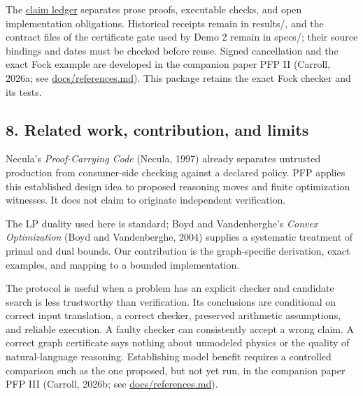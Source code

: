 \documentclass[
  11pt,
]{article}
\begin{document}
The
\href{https://github.com/dbccpage/the_symbol_game/blob/main/education/documentation/030_pfp_proposal_fidelity_protocol_pfp/papers/symbol_game/001_pfp_discrete_cochain_retraction_and_toy_involutions/paper_claim_ledger.md}{claim
ledger} separates prose proofs, executable checks, and open
implementation obligations. Historical receipts remain in results/, and
the contract files of the certificate gate used by Demo 2 remain in
specs/; their source bindings and dates must be checked before reuse.
Signed cancellation and the exact Fock example are developed in the
companion paper PFP II (Carroll, 2026a; see
\href{https://github.com/dbccpage/the_symbol_game/blob/main/education/documentation/030_pfp_proposal_fidelity_protocol_pfp/papers/symbol_game/001_pfp_discrete_cochain_retraction_and_toy_involutions/docs/references.md}{docs/references.md}).
This package retains the exact Fock checker and its tests.

\subsection{8. Related work, contribution, and
limits}\label{related-work-contribution-and-limits}

Necula's \emph{Proof-Carrying Code} (Necula, 1997) already separates
untrusted production from consumer-side checking against a declared
policy. PFP applies this established design idea to proposed reasoning
moves and finite optimization witnesses. It does not claim to originate
independent verification.

The LP duality used here is standard; Boyd and Vandenberghe's
\emph{Convex Optimization} (Boyd and Vandenberghe, 2004) supplies a
systematic treatment of primal and dual bounds. Our contribution is the
graph-specific derivation, exact examples, and mapping to a bounded
implementation.

The protocol is useful when a problem has an explicit checker and
candidate search is less trustworthy than verification. Its conclusions
are conditional on correct input translation, a correct checker,
preserved arithmetic assumptions, and reliable execution. A faulty
checker can consistently accept a wrong claim. A correct graph
certificate says nothing about unmodeled physics or the quality of
natural-language reasoning. Establishing model benefit requires a
controlled comparison such as the one proposed, but not yet run, in the
companion paper PFP III (Carroll, 2026b; see
\href{https://github.com/dbccpage/the_symbol_game/blob/main/education/documentation/030_pfp_proposal_fidelity_protocol_pfp/papers/symbol_game/001_pfp_discrete_cochain_retraction_and_toy_involutions/docs/references.md}{docs/references.md}).
\end{document}
